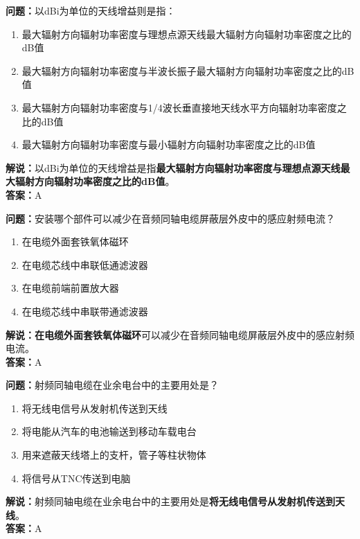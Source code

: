 \textbf{问题：}以dBi为单位的天线增益则是指：
\begin{enumerate}[label=\Alph*), leftmargin=1.5cm]
	\item 最大辐射方向辐射功率密度与理想点源天线最大辐射方向辐射功率密度之比的dB值
	\item 最大辐射方向辐射功率密度与半波长振子最大辐射方向辐射功率密度之比的dB值
	\item 最大辐射方向辐射功率密度与1/4波长垂直接地天线水平方向辐射功率密度之比的dB值
	\item 最大辐射方向辐射功率密度与最小辐射方向辐射功率密度之比的dB值
\end{enumerate}

\textbf{解说：}以dBi为单位的天线增益是指\textbf{最大辐射方向辐射功率密度与理想点源天线最大辐射方向辐射功率密度之比的dB值}。\\\textbf{答案：}A



\textbf{问题：}安装哪个部件可以减少在音频同轴电缆屏蔽层外皮中的感应射频电流？

\begin{enumerate}[label=\Alph*), leftmargin=1.5cm]
	\item 在电缆外面套铁氧体磁环
	\item 在电缆芯线中串联低通滤波器
	\item 在电缆前端前置放大器
	\item 在电缆芯线中串联带通滤波器
\end{enumerate}

\textbf{解说：}\textbf{在电缆外面套铁氧体磁环}可以减少在音频同轴电缆屏蔽层外皮中的感应射频电流。\\\textbf{答案：}A



\textbf{问题：}射频同轴电缆在业余电台中的主要用处是？

\begin{enumerate}[label=\Alph*), leftmargin=1.5cm]
	\item 将无线电信号从发射机传送到天线
	\item 将电能从汽车的电池输送到移动车载电台
	\item 用来遮蔽天线塔上的支杆，管子等柱状物体
	\item 将信号从TNC传送到电脑
\end{enumerate}

\textbf{解说：}射频同轴电缆在业余电台中的主要用处是\textbf{将无线电信号从发射机传送到天线}。\\\textbf{答案：}A



